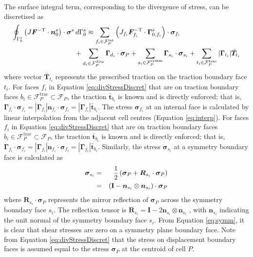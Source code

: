 \documentclass[sn-mathphys,Numbered]{sn-jnl}%
\newcommand{\bb}{\boldsymbol}
\begin{document}
The surface integral term, corresponding to the divergence of stress, can be discretised as
\begin{align} \label{eq:divStressDiscret}
	\oint_{\Gamma_0^s} \left( J \bb{F}^{-\text{T}} \cdot \bb{n}_0^s \right) \cdot \bb{\sigma}^s & \, d\Gamma_0^s
	\approx  \sum_{f_i \in \mathcal{F}_P^{\text{int}}} \left( J_{f_i} \bb{F}^{-\text{T}}_{f_i} \cdot \bb{\Gamma}_{0,f_i}^s \right) \cdot \bb{\sigma}_{f_i} \notag \\
	&+ \sum_{d_i \in \mathcal{F}_P^{\text{disp}}} \bb{\Gamma}_{d_i} \cdot \bb{\sigma}_{P}
	+ \sum_{s_i \in \mathcal{F}_P^{\text{symm}}} \bb{\Gamma}_{s_i} \cdot \bb{\sigma}_{s_i}
	+ \sum_{t_i \in \mathcal{F}_P^{\text{trac}}} |\bb{\Gamma}_{t_i}| \bar{\bb{T}}_{t_i}
\end{align}
where vector $\bar{\bb{T}}_{t_i}$ represents the prescribed traction on the traction boundary face $t_i$.
For faces $f_i$ in Equation \ref{eq:divStressDiscret} that are on traction boundary faces $b_i \in \mathcal{F}_P^{\text{trac}} \subset \mathcal{F}_P$, 
the traction $\bar{\bb{t}}_{b_i}$ is known and is directly enforced; that is, $\bb{\Gamma}_{f_i} \cdot \bb{\sigma}_{f_i} = |\bb{\Gamma}_{f_i}| \bb{n}_{f_i} \cdot \bb{\sigma}_{f_i} =  |\bb{\Gamma}_{f_i}| \bar{\bb{t}}_{b_i}$.
The stress $\bb{\sigma}_{f_i}$ at an internal face is calculated by linear interpolation from the adjacent cell centres (Equation \ref{eq:interp}).
For faces $f_i$ in Equation \ref{eq:divStressDiscret} that are on traction boundary faces $b_i \in \mathcal{F}_P^{\text{trac}} \subset \mathcal{F}_P$, the traction $\bar{\bb{t}}_{b_i}$ is known and is directly enforced; that is, $\bb{\Gamma}_{f_i} \cdot \bb{\sigma}_{f_i} = |\bb{\Gamma}_{f_i}| \bb{n}_{f_i} \cdot \bb{\sigma}_{f_i} =  |\bb{\Gamma}_{f_i}| \bar{\bb{t}}_{b_i}$.
Similarly, the stress $\bb{\sigma}_{s_i}$ at a symmetry boundary face is calculated as
\begin{eqnarray} \label{eq:symm}
	\bb{\sigma}_{s_i}
		&=& \frac{1}{2} \left (\bb{\sigma}_P + \bb{R}_{s_i} \cdot \bb{\sigma}_{P} \right) \notag \\
		&=& \left (\textbf{I} - \bb{n}_{s_i} \otimes \bb{n}_{s_i} \right) \cdot \bb{\sigma}_P
\end{eqnarray}
where $\bb{R}_{s_i} \cdot \bb{\sigma}_{P}$ represents the mirror reflection of $\bb{\sigma}_P$ across the symmetry boundary face $s_i$.
The reflection tensor is $\bb{R}_{s_i} = \textbf{I} - 2 \bb{n}_{s_i} \otimes \bb{n}_{s_i}$ \citep{Demirdzic2022}, with $\bb{n}_{s_i}$ indicating the unit normal of the symmetry boundary face $s_i$.
From Equation \ref{eq:symm}, it is clear that shear stresses are zero on a symmetry plane boundary face.
Note from Equation \ref{eq:divStressDiscret} that the stress on displacement boundary faces is assumed equal to the stress $\bb{\sigma}_P$ at the centroid of cell $P$.
\end{document}
